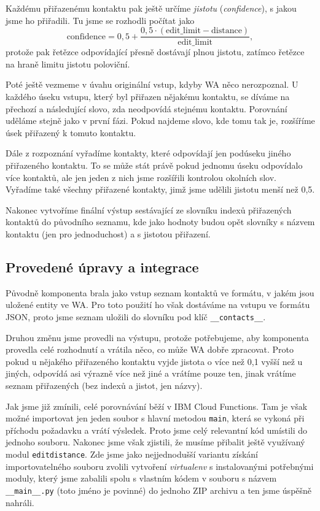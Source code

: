 Každému přiřazenému kontaktu pak ještě určíme \textit{jistotu} (\textit{confidence}),
s jakou jsme ho přiřadili. Tu jsme se rozhodli počítat jako
\[ \text{confidence} = 0,5 + \frac{0,5 \cdot (\text{edit\_limit} - \text{distance})}{\text{edit\_limit}} ,\]
protože pak řetězce odpovídající přesně dostávají plnou jistotu, zatímco řetězce na
hraně limitu jistotu poloviční.

Poté ještě vezmeme v úvahu originální vstup, kdyby WA něco nerozpoznal. U každého
úseku vstupu, který byl přiřazen nějakému kontaktu, se díváme na přechozí a následující
slovo, zda neodpovídá stejnému kontaktu. Porovnání uděláme stejně jako v první fázi.
Pokud najdeme slovo, kde tomu tak je, rozšíříme úsek přiřazený k tomuto kontaktu.

Dále z rozpoznání vyřadíme kontakty, které odpovídají jen podúseku jiného
přiřazeného kontaktu. To se může stát právě pokud jednomu úseku odpovídalo více
kontaktů, ale jen jeden z nich jsme rozšířili kontrolou okolních slov. Vyřadíme také
všechny přiřazené kontakty, jimž jsme udělili jistotu menší než 0,5.

Nakonec vytvoříme finální výstup sestávající ze slovníku indexů přiřazených kontaktů
do původního seznamu, kde jako hodnoty budou opět slovníky s názvem kontaktu (jen pro
jednoduchost) a s jistotou přiřazení.

\subsection{Provedené úpravy a integrace}

Původně komponenta brala jako vstup seznam kontaktů ve formátu, v jakém jsou uložené
entity ve WA. Pro toto použití ho však dostáváme na vstupu ve formátu JSON, proto
jsme seznam uložili do slovníku pod klíč \texttt{\_\_contacts\_\_}.

Druhou změnu jsme provedli na výstupu, protože potřebujeme, aby komponenta provedla
celé rozhodnutí a vrátila něco, co může WA dobře zpracovat. Proto pokud u nějakého
přiřazeného kontaktu vyjde jistota o více než 0,1 vyšší než u jiných, odpovídá asi
výrazně více než jiné a vrátíme pouze
ten, jinak vrátíme seznam přiřazených (bez indexů a jistot, jen názvy).

Jak jsme již zmínili, celé porovnávání běží v IBM Cloud Functions. Tam je však možné
importovat jen jeden soubor s hlavní metodou \texttt{main}, která se vykoná při
příchodu požadavku a vrátí výsledek. Proto jsme celý relevantní kód umístili do
jednoho souboru. Nakonec jsme však zjistili, že musíme přibalit ještě využívaný
modul \texttt{editdistance}. Zde jsme jako nejjednodušší variantu získání importovatelného souboru
zvolili vytvoření \textit{virtualenv} s instalovanými potřebnými moduly,
který jsme zabalili spolu s vlastním kódem v souboru s názvem \texttt{\_\_main\_\_.py}
(toto jméno je povinné) do jednoho ZIP archivu a ten jsme úspěšně nahráli.